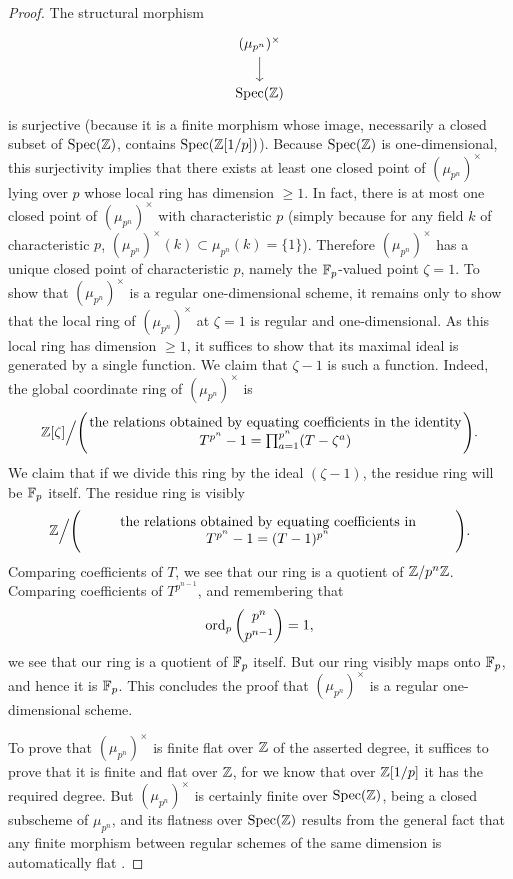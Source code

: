 \begin{proof}
The structural morphism
\[
\begin{tikzcd}
(\mu_{p^n})^\times \arrow[d] \\
\Spec(\Z)
\end{tikzcd}
\]
is surjective (because it is a finite morphism whose image, necessarily a closed subset of $\operatorname{Spec}(\mathbb{Z})$, contains $\operatorname{Spec}(\mathbb{Z}[1/p])$). Because $\operatorname{Spec}(\mathbb{Z})$ is one-dimensional, this surjectivity implies that there exists at least one closed point of $(\mu_{p^n})^\times$ lying over $p$ whose local ring has dimension $\ge 1$. In fact, there is at most one closed point of $(\mu_{p^n})^\times$ with characteristic $p$ (simply because for any field $k$ of characteristic $p$, $(\mu_{p^n})^\times(k) \subset \mu_{p^n}(k) = \{1\}$). Therefore $(\mu_{p^n})^\times$ has a unique closed point of characteristic $p$, namely the $\mathbb{F}_p$-valued point $\zeta = 1$. To show that $(\mu_{p^n})^\times$ is a regular one-dimensional scheme, it remains only to show that the local ring of $(\mu_{p^n})^\times$ at $\zeta = 1$ is regular and one-dimensional. As this local ring has dimension $\ge 1$, it suffices to show that its maximal ideal is generated by a single function. We claim that $\zeta - 1$ is such a function. Indeed, the global coordinate ring of $(\mu_{p^n})^\times$ is
\[
\Z[\zeta] \Big/ \Biggl( \parbox{0.78\linewidth}{\centering the relations obtained by equating coefficients in the identity $T^{p^n} - 1 = \prod_{a=1}^{p^n} (T - \zeta^a)$} \Biggr).
\]
We claim that if we divide this ring by the ideal $(\zeta - 1)$, the residue ring will be $\mathbb{F}_p$ itself. The residue ring is visibly
\[
\Z \Big/ \Biggl( \parbox{0.78\linewidth}{\centering the relations obtained by equating coefficients in $T^{p^n} - 1 = (T - 1)^{p^n}$} \Biggr).
\]
Comparing coefficients of $T$, we see that our ring is a quotient of $\mathbb{Z}/p^n\mathbb{Z}$. Comparing coefficients of $T^{p^{n-1}}$, and remembering that
\[
\operatorname{ord}_p \binom{p^n}{p^{n-1}} = 1,
\]
we see that our ring is a quotient of $\mathbb{F}_p$ itself. But our ring visibly maps onto $\mathbb{F}_p$, and hence it is $\mathbb{F}_p$. This concludes the proof that $(\mu_{p^n})^\times$ is a regular one-dimensional scheme.

To prove that $(\mu_{p^n})^\times$ is finite flat over $\mathbb{Z}$ of the asserted degree, it suffices to prove that it is finite and flat over $\mathbb{Z}$, for we know that over $\mathbb{Z}[1/p]$ it has the required degree. But $(\mu_{p^n})^\times$ is certainly finite over $\operatorname{Spec}(\mathbb{Z})$, being a closed subscheme of $\mu_{p^n}$, and its flatness over $\operatorname{Spec}(\mathbb{Z})$ results from the general fact that any finite morphism between regular schemes of the same dimension is automatically flat \cite[V, 3.6]{AK1}.
\end{proof}

